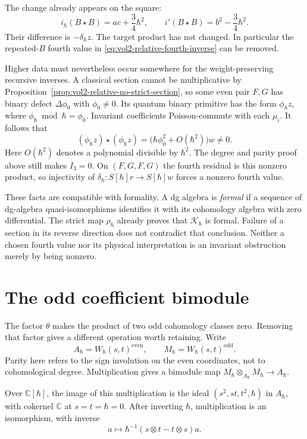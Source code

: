 The change already appears on the square:
\[
 i_\hbar(B\star B)=ac+\frac34\hbar^2,\qquad
 i'(B\star B)=b^2-\frac34\hbar^2.
\]
Their difference is $-\delta_\hbar z$.
The target product has not changed. In particular the
repeated-$B$ fourth value in
\eqref{eq:vol2-relative-fourth-inverse} can be removed.

Higher data must nevertheless occur somewhere for the
weight-preserving recursive inverses. A classical section
cannot be multiplicative by
Proposition~\ref{prop:vol2-relative-no-strict-section}, so some
even pair $F,G$ has binary defect $\Delta\phi_0$ with
$\phi_0\ne0$. Its quantum binary primitive has the form
$\phi_\hbar z$, where $\phi_\hbar\bmod\hbar=\phi_0$.
Invariant coefficients Poisson-commute with each $\mu_i$.
It follows that
\[
 (\phi_\hbar z)\star(\phi_\hbar z)
   =\bigl(\hbar\phi_0^2+O(\hbar^2)\bigr)w\ne0.
\]
Here $O(\hbar^2)$ denotes a polynomial divisible by $\hbar^2$.
The degree and parity proof above still makes $I_3=0$.
On $(F,G,F,G)$ the fourth residual is this nonzero product,
so injectivity of $\delta_\hbar:S[\hbar]r\to S[\hbar]w$
forces a nonzero fourth value.

These facts are compatible with formality.
A dg algebra is \emph{formal} if a sequence of dg-algebra
quasi-isomorphisms identifies it with its cohomology algebra
with zero differential.
The strict map $\rho_\hbar$ already proves that
$\mathcal K_\hbar$ is formal. Failure of a section in its
reverse direction does not contradict that conclusion.
Neither a chosen fourth value nor its physical interpretation
is an invariant obstruction merely by being nonzero.

\section{The odd coefficient bimodule}
\label{sec:vol2-relative-odd-bimodule}

The factor $\theta$ makes the product of two odd cohomology
classes zero. Removing that factor gives a different
operation worth retaining. Write
\[
 A_\hbar=W_\hbar(s,t)^{\mathrm{even}},\qquad
 M_\hbar=W_\hbar(s,t)^{\mathrm{odd}}.
\]
Parity here refers to the sign involution on the even
coordinates, not to cohomological degree. Multiplication
gives a bimodule map
$M_\hbar\otimes_{A_\hbar}M_\hbar\to A_\hbar$.

\begin{proposition}\label{prop:vol2-relative-odd-bimodule}
Over $\mathbb C[\hbar]$, the image of this multiplication
is the ideal $(s^2,st,t^2,\hbar)$ in $A_\hbar$, with
cokernel $\mathbb C$ at $s=t=\hbar=0$.
After inverting $\hbar$, multiplication is an isomorphism,
with inverse
\[
 a\longmapsto
   \hbar^{-1}(s\otimes t-t\otimes s)a.
\]
\end{proposition}

